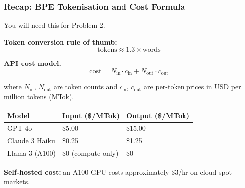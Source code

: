 \documentclass[9pt,t]{beamer}
\begin{document}
\begin{frame}
\frametitle{Recap: BPE Tokenisation and Cost Formula}

You will need this for Problem 2.

\medskip
\textbf{Token conversion rule of thumb:}
\[
\text{tokens} \approx 1.3 \times \text{words}
\]

\medskip
\textbf{API cost model:}
\[
\text{cost} = N_{\text{in}} \cdot c_{\text{in}} + N_{\text{out}} \cdot c_{\text{out}}
\]

where $N_{\text{in}}$, $N_{\text{out}}$ are token counts and $c_{\text{in}}$, $c_{\text{out}}$ are
per-token prices in USD per million tokens (MTok).

\medskip
\begin{tabular}{lll}
\toprule
\textbf{Model} & \textbf{Input (\$/MTok)} & \textbf{Output (\$/MTok)} \\
\midrule
GPT-4o           & \$5.00 & \$15.00 \\
Claude 3 Haiku   & \$0.25 & \$1.25 \\
Llama 3 (A100)   & \$0 (compute only) & \$0 \\
\bottomrule
\end{tabular}

\medskip
\textbf{Self-hosted cost:} an A100 GPU costs approximately \$3/hr on cloud spot markets.
\end{frame}
\end{document}
